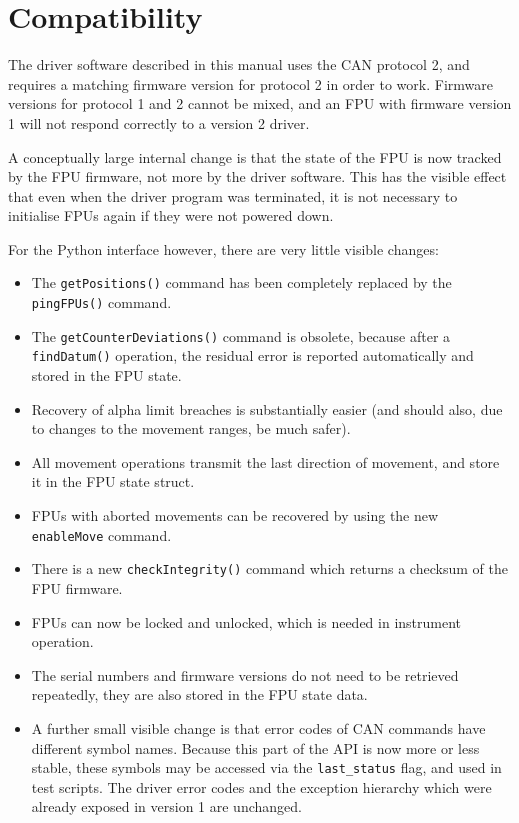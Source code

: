 \documentclass[fontsize=12,a4paper]{scrreprt}
\begin{document}
\section{Compatibility}
The driver software described in this manual uses the CAN protocol 2,
and requires a matching firmware version for protocol 2 in order to
work. Firmware versions for protocol 1 and 2 cannot be mixed, and an
FPU with firmware version 1 will not respond correctly to a version 2
driver.

A conceptually large internal change is that the state of the FPU is
now tracked by the FPU firmware, not more by the driver software. This
has the visible effect that even when the driver program was
terminated, it is not necessary to initialise FPUs again if they were
not powered down.

For the Python interface however, there are very little visible
changes:
\begin{itemize}
\item The \texttt{getPositions()} command has been completely replaced
  by the \texttt{pingFPUs()} command.
\item The \texttt{getCounterDeviations()} command is obsolete, because
  after a \texttt{findDatum()} operation, the residual error is
  reported automatically and stored in the FPU state.
\item Recovery of alpha limit breaches is substantially easier (and
  should also, due to changes to the movement ranges, be much safer).
\item All movement operations transmit the last direction of
    movement, and store it in the FPU state struct.
  \item FPUs with aborted movements can be recovered by using
    the new \texttt{enableMove} command.
  \item There is a new \texttt{checkIntegrity()} command which returns
    a checksum of the FPU firmware.
  \item FPUs can now be locked and unlocked, which is needed in
    instrument operation.
  \item The serial numbers and firmware versions do not need to be
    retrieved repeatedly, they are also stored in the FPU state data.

  \item A further small visible change is that error codes of CAN
    commands have different symbol names. Because this part of the API
    is now more or less stable, these symbols may be accessed via the
    \texttt{last\_status} flag, and used in test scripts. The driver
    error codes and the exception hierarchy which were already exposed
    in version 1 are unchanged.

\end{itemize}
\end{document}
